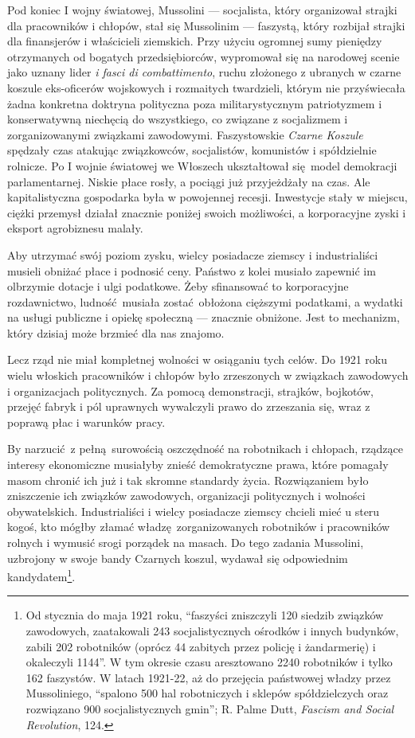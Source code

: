 \documentclass[12pt]{book}
\begin{document}
Pod koniec I wojny światowej, Mussolini — socjalista, który organizował strajki dla pracowników i chłopów, stał się Mussolinim — faszystą, który rozbijał strajki dla finansjerów i właścicieli ziemskich. Przy użyciu ogromnej sumy pieniędzy otrzymanych od bogatych przedsiębiorców, wypromował się na narodowej scenie jako uznany lider \textit{i fasci di combattimento}, ruchu złożonego z ubranych w czarne koszule eks-oficerów wojskowych i rozmaitych twardzieli, którym nie przyświecała żadna konkretna doktryna polityczna poza militarystycznym patriotyzmem i konserwatywną niechęcią do wszystkiego, co związane z socjalizmem i zorganizowanymi związkami zawodowymi. Faszystowskie \textit{Czarne Koszule} spędzały czas atakując związkowców, socjalistów, komunistów i spółdzielnie rolnicze. Po I wojnie światowej we Włoszech ukształtował się model demokracji parlamentarnej. Niskie płace rosły, a pociągi już przyjeżdżały na czas. Ale kapitalistyczna gospodarka była w powojennej recesji. Inwestycje stały w miejscu, ciężki przemysł działał znacznie poniżej swoich możliwości, a korporacyjne zyski i eksport agrobiznesu malały.

Aby utrzymać swój poziom zysku, wielcy posiadacze ziemscy i industrialiści musieli obniżać płace i podnosić ceny. Państwo z kolei musiało zapewnić im olbrzymie dotacje i ulgi podatkowe. Żeby sfinansować to korporacyjne rozdawnictwo, ludność musiała zostać obłożona cięższymi podatkami, a wydatki na usługi publiczne i opiekę społeczną — znacznie obniżone. Jest to mechanizm, który dzisiaj może brzmieć dla nas znajomo.

Lecz rząd nie miał kompletnej wolności w osiąganiu tych celów. Do 1921 roku wielu włoskich pracowników i chłopów było zrzeszonych w związkach zawodowych i organizacjach politycznych. Za pomocą demonstracji, strajków, bojkotów, przejęć fabryk i pól uprawnych wywalczyli prawo do zrzeszania się, wraz z poprawą płac i warunków pracy.

By narzucić z pełną surowością oszczędność na robotnikach i chłopach, rządzące interesy ekonomiczne musiałyby znieść demokratyczne prawa, które pomagały masom chronić ich już i tak skromne standardy życia. Rozwiązaniem było zniszczenie ich związków zawodowych, organizacji politycznych i wolności obywatelskich. Industrialiści i wielcy posiadacze ziemscy chcieli mieć u steru kogoś, kto mógłby złamać władzę zorganizowanych robotników i pracowników rolnych i wymusić srogi porządek na masach. Do tego zadania Mussolini, uzbrojony w swoje bandy Czarnych koszul, wydawał się odpowiednim kandydatem\footnote{Od stycznia do maja 1921 roku, ``faszyści zniszczyli 120 siedzib związków zawodowych, zaatakowali 243 socjalistycznych ośrodków i innych budynków, zabili 202 robotników (oprócz 44 zabitych przez policję i żandarmerię) i okaleczyli 1144''. W tym okresie czasu aresztowano 2240 robotników i tylko 162 faszystów. W latach 1921-22, aż do przejęcia państwowej władzy przez Mussoliniego, ``spalono 500 hal robotniczych i sklepów spółdzielczych oraz rozwiązano 900 socjalistycznych gmin''; R. Palme Dutt, \textit{Fascism and Social Revolution}, 124.}.
\end{document}
